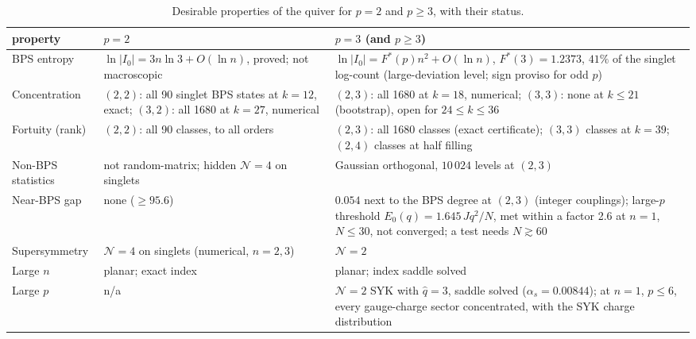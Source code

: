 \documentclass[10pt]{article}
\begin{document}
\begin{table}[t]\centering\small
\begin{tabular}{p{}p{}p{}}
\toprule
property & $p=2$ & $p=3$ (and $p\ge3$)\\
\midrule
BPS entropy & $\ln|I_0|=3n\ln3+O(\ln n)$, proved; not macroscopic &
$\ln|I_0|=F^*(p)n^2+O(\ln n)$, $F^*(3)=1.2373$, $41\%$ of the singlet log-count (large-deviation level; sign proviso
for odd $p$)\\
Concentration & $(2,2)$: all 90 singlet BPS states at $k=12$, exact; $(3,2)$: all 1680 at $k=27$, numerical &
$(2,3)$: all 1680 at $k=18$, numerical; $(3,3)$: none at $k\le21$ (bootstrap), open for $24\le k\le36$\\
Fortuity (rank) & $(2,2)$: all 90 classes, to all orders & $(2,3)$: all 1680 classes (exact certificate);
$(3,3)$ classes at $k=39$; $(2,4)$ classes at half filling\\
Non-BPS statistics & not random-matrix; hidden $\mathcal N=4$ on singlets & Gaussian orthogonal, $10\,024$ levels at
$(2,3)$\\
Near-BPS gap & none ($\ge95.6$) & $0.054$ next to the BPS degree at $(2,3)$ (integer couplings); large-$p$
threshold $E_0(q)=1.645\,Jq^2/N$, met within a factor 2.6 at $n=1$, $N\le30$, not converged; a test needs
$N\gtrsim60$\\
Supersymmetry & $\mathcal N=4$ on singlets (numerical, $n=2,3$) & $\mathcal N=2$\\
Large $n$ & planar; exact index & planar; index saddle solved\\
Large $p$ & n/a & $\mathcal N=2$ SYK with $\hat q=3$, saddle solved ($\alpha_s=0.00844$); at $n=1$, $p\le6$, every
gauge-charge sector concentrated, with the SYK charge distribution\\
\bottomrule
\end{tabular}
\caption{Desirable properties of the quiver for $p=2$ and $p\ge3$, with their status.}
\label{tab:scorecard}
\end{table}
\end{document}
